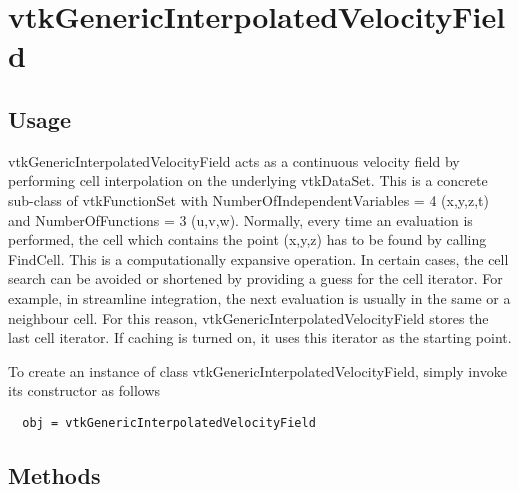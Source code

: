 \section{vtkGenericInterpolatedVelocityField}

\subsection{Usage}

 vtkGenericInterpolatedVelocityField acts as a continuous velocity field
 by performing cell interpolation on the underlying vtkDataSet.
 This is a concrete sub-class of vtkFunctionSet with 
 NumberOfIndependentVariables = 4 (x,y,z,t) and 
 NumberOfFunctions = 3 (u,v,w). Normally, every time an evaluation
 is performed, the cell which contains the point (x,y,z) has to
 be found by calling FindCell. This is a computationally expansive 
 operation. In certain cases, the cell search can be avoided or shortened 
 by providing a guess for the cell iterator. For example, in streamline
 integration, the next evaluation is usually in the same or a neighbour
 cell. For this reason, vtkGenericInterpolatedVelocityField stores the last
 cell iterator. If caching is turned on, it uses this iterator as the
 starting point.

To create an instance of class vtkGenericInterpolatedVelocityField, simply
invoke its constructor as follows
\begin{verbatim}
  obj = vtkGenericInterpolatedVelocityField
\end{verbatim}
\subsection{Methods}

